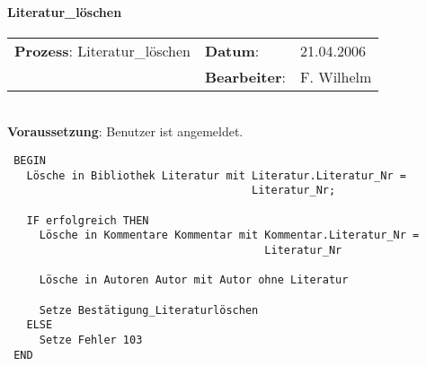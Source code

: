 \paragraph{Literatur\_löschen}
\begin{tabular}[t]{p{9.5cm}ll}
\textbf{Prozess}: Literatur\_löschen  	&\textbf{Datum}:      &21.04.2006\\
					&\textbf{Bearbeiter}: &F. Wilhelm\\
\end{tabular}

\hrulefill\\
\textbf{Voraussetzung}: Benutzer ist angemeldet.
\begin{verbatim}
 BEGIN
   Lösche in Bibliothek Literatur mit Literatur.Literatur_Nr = 
                                      Literatur_Nr;

   IF erfolgreich THEN
     Lösche in Kommentare Kommentar mit Kommentar.Literatur_Nr = 
                                        Literatur_Nr

     Lösche in Autoren Autor mit Autor ohne Literatur

     Setze Bestätigung_Literaturlöschen
   ELSE
     Setze Fehler 103
 END
\end{verbatim}
\hrulefill